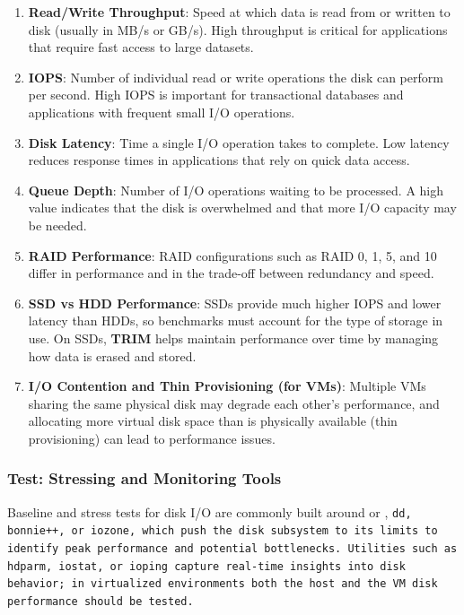 \begin{enumerate}[leftmargin=1.4em]
    \item \textbf{Read/Write Throughput}: Speed at which data is read from or written to disk (usually in MB/s or GB/s). High throughput is critical for applications that require fast access to large datasets.
    \item \textbf{IOPS}: Number of individual read or write operations the disk can perform per second. High IOPS is important for transactional databases and applications with frequent small I/O operations.
    \item \textbf{Disk Latency}: Time a single I/O operation takes to complete. Low latency reduces response times in applications that rely on quick data access.
    \item \textbf{Queue Depth}: Number of I/O operations waiting to be processed. A high value indicates that the disk is overwhelmed and that more I/O capacity may be needed.
    \item \textbf{RAID Performance}: RAID configurations such as RAID 0, 1, 5, and 10 differ in performance and in the trade-off between redundancy and speed.
    \item \textbf{SSD vs HDD Performance}: SSDs provide much higher IOPS and lower latency than HDDs, so benchmarks must account for the type of storage in use. On SSDs, \textbf{TRIM} helps maintain performance over time by managing how data is erased and stored.
    \item \textbf{I/O Contention and Thin Provisioning (for VMs)}: Multiple VMs sharing the same physical disk may degrade each other's performance, and allocating more virtual disk space than is physically available (thin provisioning) can lead to performance issues.
\end{enumerate}

\subsubsection{Test: Stressing and Monitoring Tools}

Baseline and stress tests for disk I/O are commonly built around  or , \tt{dd}, \tt{bonnie++}, or \tt{iozone}, which push the disk subsystem to its limits to identify peak performance and potential bottlenecks. Utilities such as \tt{hdparm}, \tt{iostat}, or \tt{ioping} capture real-time insights into disk behavior; in virtualized environments both the host and the VM disk performance should be tested.

